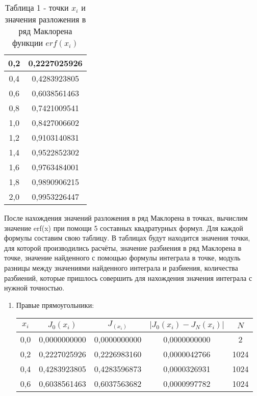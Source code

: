 \documentclass[a4paper,12pt]{article}
\begin{document}
{\begin{table}[h]
\begin{tabular}{|c|c|}
        \hline
        0,2 & 0,2227025926\\
        \hline
        0,4 & 0,4283923805\\
        \hline
        0,6 & 0,6038561463\\
        \hline
        0,8 & 0,7421009541\\
        \hline
        1,0 & 0,8427006602\\
        \hline
        1,2 & 0,9103140831\\
        \hline
        1,4 & 0,9522852302\\
        \hline
        1,6 & 0,9763484001\\
        \hline
        1,8 & 0,9890906215\\
        \hline
        2,0 & 0,9953226447\\
        \hline
    \end{tabular}
    \caption*{\small{Таблица 1 - точки $x_i$ и значения разложения в ряд Маклорена функции $erf(x_i)$}}
\end{table}
\clearpage
После нахождения значений разложения в ряд Маклорена в точках, вычислим значение erf(x) при помощи 5 составных квадратурных формул. Для каждой формулы составим свою таблицу. В таблицах будут находится значения точки, для которой производились расчёты, значение разбиения в ряд Маклорена в точке, значение найден\-ного с помощью формулы интеграла в точке, модуль разницы между значениями найде\-нного интеграла и разбиения, количества разбиений, которые пришлось совершить для нахожде\-ния значения интеграла с нужной точностью.
\begin{enumerate}[label = \arabic*.]
    \item {Правые прямоугольники:
        \begin{table}[h]
          \centering
          \begin{tabular}{|c|c|c|c|c|}
            \hline
            $x_i$ & $J_0(x_i)$ & $J_(x_i)$ & $\left|J_0(x_i) - J_N(x_i)\right|$ & $N$\\
            \hline
            0,0 & 0,0000000000 & 0,0000000000 & 0,0000000000 & 2\\
            \hline
            0,2 & 0,2227025926 & 0,2226983160 & 0,0000042766 & 1024\\
            \hline
            0,4 & 0,4283923805 & 0,4283596873 & 0,0000326931 & 1024\\
            \hline
            0,6 & 0,6038561463 & 0,6037563682 & 0,0000997782 & 1024\\
            \hline

\end{tabular}
\end{table}}
\end{enumerate}}
\end{document}
